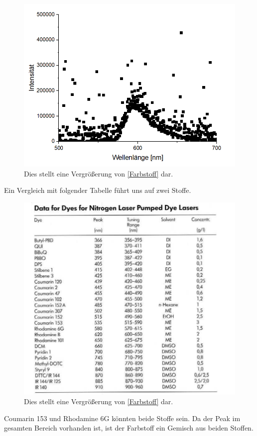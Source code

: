\documentclass[
	a4paper,
	12pt,
	pagesize,
	ngerman
]{scrartcl}
\begin{document}
\begin{figure}[h!]
	\centering
	\includegraphics[scale = 1]{cool.png}
	\caption{Dies stellt eine Vergrößerung von \cref{Farbstoff} dar.}
	\label{cool}
\end{figure}
Ein Vergleich mit folgender Tabelle führt uns auf zwei Stoffe.
\begin{figure}[h!]
	\centering
	\includegraphics[scale = 1]{data.png}
	\caption{Dies stellt eine Vergrößerung von \cref{Farbstoff} dar.}
	\label{data}
\end{figure}
Coumarin 153 und Rhodamine 6G könnten beide Stoffe sein. Da der Peak im gesamten Bereich vorhanden ist, ist der Farbstoff ein Gemisch aus beiden Stoffen.
\end{document}
